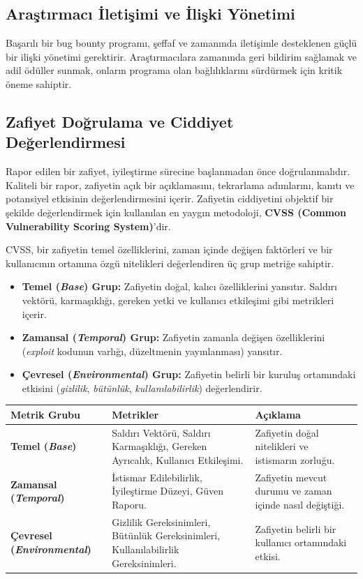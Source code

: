 \subsection{Araştırmacı İletişimi ve İlişki Yönetimi}

Başarılı bir bug bounty programı, şeffaf ve zamanında iletişimle desteklenen güçlü bir ilişki yönetimi gerektirir. Araştırmacılara zamanında geri bildirim sağlamak ve adil ödüller sunmak, onların programa olan bağlılıklarını sürdürmek için kritik öneme sahiptir.

\subsection{Zafiyet Doğrulama ve Ciddiyet Değerlendirmesi}

Rapor edilen bir zafiyet, iyileştirme sürecine başlanmadan önce doğrulanmalıdır. Kaliteli bir rapor, zafiyetin açık bir açıklamasını, tekrarlama adımlarını, kanıtı ve potansiyel etkisinin değerlendirmesini içerir. Zafiyetin ciddiyetini objektif bir şekilde değerlendirmek için kullanılan en yaygın metodoloji, \textbf{CVSS (Common Vulnerability Scoring System)}'dir.

CVSS, bir zafiyetin temel özelliklerini, zaman içinde değişen faktörleri ve bir kullanıcının ortamına özgü nitelikleri değerlendiren üç grup metriğe sahiptir.

\begin{itemize}
\item \textbf{Temel (\textit{Base}) Grup:} Zafiyetin doğal, kalıcı özelliklerini yansıtır. Saldırı vektörü, karmaşıklığı, gereken yetki ve kullanıcı etkileşimi gibi metrikleri içerir.
\item \textbf{Zamansal (\textit{Temporal}) Grup:} Zafiyetin zamanla değişen özelliklerini (\textit{exploit} kodunun varlığı, düzeltmenin yayınlanması) yansıtır.
\item \textbf{Çevresel (\textit{Environmental}) Grup:} Zafiyetin belirli bir kuruluş ortamındaki etkisini (\textit{gizlilik}, \textit{bütünlük}, \textit{kullanılabilirlik}) değerlendirir.
\end{itemize}

\begin{tabular}{|l|l|l|}
\hline
\textbf{Metrik Grubu} & \textbf{Metrikler} & \textbf{Açıklama} \\
\hline
\textbf{Temel (\textit{Base})} & Saldırı Vektörü, Saldırı Karmaşıklığı, Gereken Ayrıcalık, Kullanıcı Etkileşimi. & Zafiyetin doğal nitelikleri ve istismarın zorluğu. \\
\hline
\textbf{Zamansal (\textit{Temporal})} & İstismar Edilebilirlik, İyileştirme Düzeyi, Güven Raporu. & Zafiyetin mevcut durumu ve zaman içinde nasıl değiştiği. \\
\hline
\textbf{Çevresel (\textit{Environmental})} & Gizlilik Gereksinimleri, Bütünlük Gereksinimleri, Kullanılabilirlik Gereksinimleri. & Zafiyetin belirli bir kullanıcı ortamındaki etkisi. \\
\hline
\end{tabular}

